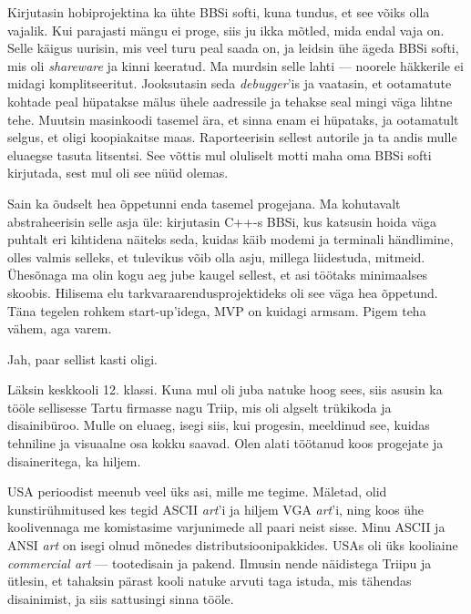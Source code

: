Kirjutasin hobiprojektina ka ühte BBSi softi, kuna tundus, et see 
võiks olla vajalik. Kui parajasti mängu ei proge, siis ju ikka mõtled, mida endal vaja on. Selle käigus 
uurisin, mis veel turu peal saada on, ja leidsin ühe ägeda BBSi softi, mis oli \emph{shareware} ja kinni keeratud. Ma murdsin selle lahti --- 
noorele häkkerile ei midagi komplitseeritut. Jooksutasin seda 
\emph{debugger}'is ja vaatasin, et ootamatute kohtade peal hüpatakse mälus 
ühele aadressile ja tehakse seal mingi väga lihtne tehe. Muutsin masinkoodi 
tasemel ära, et sinna enam ei hüpataks, ja ootamatult selgus, et oligi 
koopiakaitse maas. Raporteerisin sellest autorile ja ta andis mulle eluaegse tasuta litsentsi. See võttis mul oluliselt 
motti maha oma BBSi softi kirjutada, sest mul oli see nüüd olemas. 

Sain ka õudselt hea õppetunni enda tasemel progejana. 
Ma kohutavalt abstraheerisin selle asja üle: kirjutasin C++-s 
BBSi, kus katsusin hoida väga puhtalt eri kihtidena näiteks seda, kuidas 
käib modemi ja terminali händlimine, olles valmis selleks,
et tulevikus võib olla asju, millega liidestuda, mitmeid. 
Ühesõnaga ma olin kogu aeg jube kaugel sellest, et asi töötaks 
minimaalses skoobis. Hilisema elu tarkvaraarendusprojektideks oli see väga hea 
õppetund. Täna tegelen rohkem start-up'idega, MVP on kuidagi 
armsam. Pigem teha vähem, aga varem.


Jah, paar sellist kasti oligi. 


Läksin keskkooli 12. klassi. Kuna mul oli juba natuke hoog sees, 
siis asusin ka tööle sellisesse Tartu firmasse nagu Triip, mis oli 
algselt trükikoda ja disainibüroo. Mulle on eluaeg, isegi siis, kui 
progesin, meeldinud see, kuidas tehniline ja visuaalne osa kokku saavad. 
Olen alati töötanud koos progejate 
ja disaineritega, ka hiljem.

USA perioodist meenub veel üks asi, mille me tegime. Mäletad, olid kunstirühmitused 
kes tegid ASCII \emph{art}'i ja hiljem VGA \emph{art}'i, ning koos ühe koolivennaga me komistasime
varjunimede all paari neist sisse. Minu ASCII ja ANSI \emph{art} on isegi olnud mõnedes distributsioonipakkides. USAs oli üks kooliaine \emph{commercial art} ---
tootedisain ja pakend. Ilmusin nende näidistega Triipu ja ütlesin, et 
tahaksin pärast kooli natuke arvuti taga istuda, mis tähendas 
disainimist, ja siis sattusingi sinna tööle.
 
